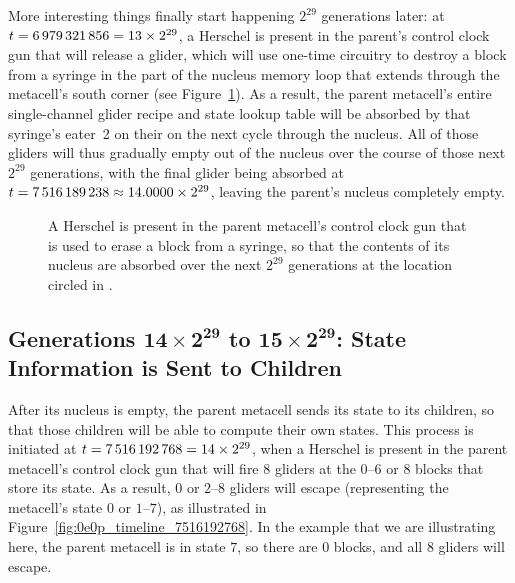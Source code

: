 More interesting things finally start happening $2^{29}$ generations later: at $t = 6{\,}979{\,}321{\,}856 = 13 \times 2^{29}$, a Herschel is present in the parent's control clock gun that will release a glider, which will use one-time circuitry to destroy a block from a syringe in the part of the nucleus memory loop that extends through the metacell's south corner (see Figure~\ref{fig:0e0p_timeline_6979321856}). As a result, the parent metacell's entire single-channel glider recipe and state lookup table will be absorbed by that syringe's eater~2 on their on the next cycle through the nucleus. All of those gliders will thus gradually empty out of the nucleus over the course of those next $2^{29}$ generations, with the final glider being absorbed at $t = 7{\,}516{\,}189{\,}238 \approx 14.0000 \times 2^{29}$, leaving the parent's nucleus completely empty.

\begin{figure}[!htb]
	\centering
	\caption{A Herschel is present in the parent metacell's control clock gun that is used to erase a block from a syringe, so that the contents of its nucleus are absorbed over the next $2^{29}$ generations at the location circled in .}
	\label{fig:0e0p_timeline_6979321856}
\end{figure}


\subsection{Generations $\mathbf{14 \times 2^{29}}$ to $\mathbf{15 \times 2^{29}}$: State Information is Sent to Children}\label{sec:0e0p_timeline_state}

After its nucleus is empty, the parent metacell sends its state to its children, so that those children will be able to compute their own states. This process is initiated at $t = 7{\,}516{\,}192{\,}768 = 14 \times 2^{29}$, when a Herschel is present in the parent metacell's control clock gun that will fire $8$ gliders at the $0$--$6$ or $8$ blocks that store its state. As a result, $0$ or $2$--$8$ gliders will escape (representing the metacell's state $0$ or $1$--$7$), as illustrated in Figure~\ref{fig:0e0p_timeline_7516192768}. In the example that we are illustrating here, the parent metacell is in state $7$, so there are $0$ blocks, and all $8$ gliders will escape.

